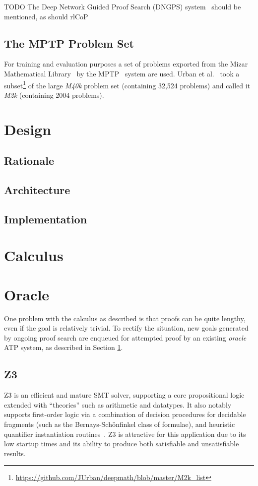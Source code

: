 \documentclass[runningheads]{llncs}
\newcommand{\z}[1]{\textsc{Z3}}
\newcommand{\mizarlarge}{\textit{M40k}}
\newcommand{\mizarsmall}{\textit{M2k}}
\begin{document}
TODO The Deep Network Guided Proof Search (DNGPS) system~\cite{DNGPS} should be mentioned, as should rlCoP~\cite{rlCoP}

\subsection{The MPTP Problem Set}
For training and evaluation purposes a set of problems exported from the Mizar Mathematical Library~\cite{mizar} by the MPTP~\cite{MPTP} system are used.
Urban et al.~\cite{rlCoP} took a subset\footnote{\url{https://github.com/JUrban/deepmath/blob/master/M2k_list}} of the large \mizarlarge{} problem set (containing 32,524 problems) and called it \mizarsmall{} (containing 2004 problems).


\section{Design}
\label{section:Design}
\subsection{Rationale}
\subsection{Architecture}
\subsection{Implementation}

\section{Calculus}

\section{Oracle}
\label{section:oracle}
One problem with the calculus as described is that proofs can be quite lengthy, even if the goal is relatively trivial.
To rectify the situation, new goals generated by ongoing proof search are enqueued for attempted proof by an existing \emph{oracle} ATP system, as described in Section \ref{section:Design}.

\subsection{Z3}
\z3{}\cite{Z3} is an efficient and mature SMT solver, supporting a core propositional logic extended with ``theories'' such as arithmetic and datatypes.
It also notably supports first-order logic via a combination of decision procedures for decidable fragments (such as the Bernays-Sch\"onfinkel class of formulae), and heuristic quantifier instantiation routines~\cite{quantifier-instantiation}.
\z3{} is attractive for this application due to its low startup times and its ability to produce both satisfiable and unsatisfiable results.
\end{document}
